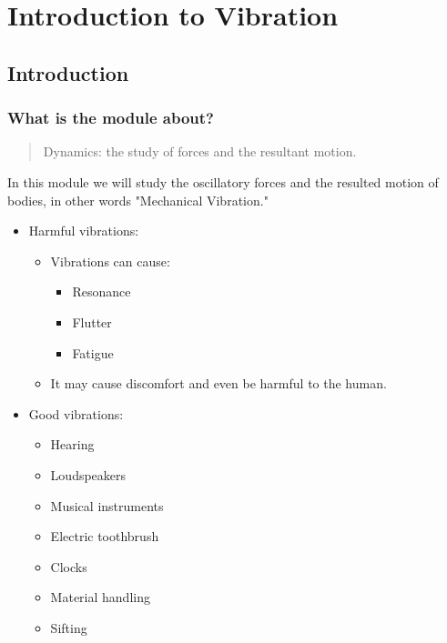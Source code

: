 \chapter{Introduction to Vibration}
\section{Introduction}
\subsection{What is the module about?}
\begin{quotation}
    Dynamics: the study of forces and the resultant motion.
\end{quotation}
In this module we will study the oscillatory forces and the resulted motion of bodies, in other words "Mechanical Vibration."
\begin{itemize}
    \item Harmful vibrations:
          \begin{itemize}
              \item Vibrations can cause:
                    \begin{itemize}
                        \item Resonance
                        \item Flutter
                        \item Fatigue
                    \end{itemize}
              \item It may cause discomfort and even be harmful to the human.
          \end{itemize}
    \item Good vibrations:
          \begin{itemize}
              \item Hearing
              \item Loudspeakers
              \item Musical instruments
              \item Electric toothbrush
              \item Clocks
              \item Material handling
              \item Sifting
          \end{itemize}
\end{itemize}
